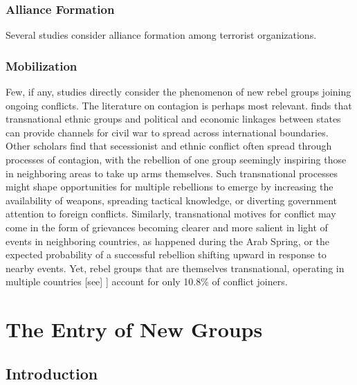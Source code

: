 \documentclass[12pt,]{book}
\begin{document}
\subsection{Alliance Formation}\label{alliance-formation}

Several studies consider alliance formation among terrorist
organizations.

\subsection{Mobilization}\label{mobilization}

Few, if any, studies directly consider the phenomenon of new rebel
groups joining ongoing conflicts. The literature on contagion is perhaps
most relevant. \citet{Gleditsch2007} finds that transnational ethnic
groups and political and economic linkages between states can provide
channels for civil war to spread across international boundaries. Other
scholars find that secessionist \citep{Ayres2000} and ethnic
\citep{Lane2016} conflict often spread through processes of contagion,
with the rebellion of one group seemingly inspiring those in neighboring
areas to take up arms themselves. Such transnational processes might
shape opportunities for multiple rebellions to emerge by increasing the
availability of weapons, spreading tactical knowledge, or diverting
government attention to foreign conflicts. Similarly, transnational
motives for conflict may come in the form of grievances becoming clearer
and more salient in light of events in neighboring countries, as
happened during the Arab Spring, or the expected probability of a
successful rebellion shifting upward in response to nearby events. Yet,
rebel groups that are themselves transnational, operating in multiple
countries {[}see{]} \citet{salehyan07}{]} account for only 10.8\% of
conflict joiners.

\chapter{The Entry of New Groups}\label{the-entry-of-new-groups}

\section{Introduction}\label{introduction-1}
\end{document}
